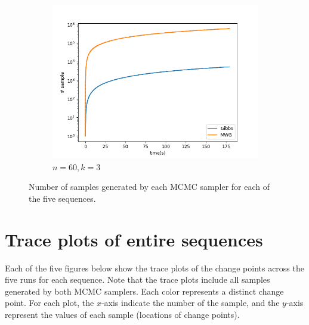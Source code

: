 \begin{figure}[H]
\begin{subfigure}{.3\textwidth}
    	\includegraphics[width=\linewidth]{../../plots/SampleTime_M4_N60_NMCMC3_seed0_diffind2.png}
    	\caption{$n=60, k=3$}
	\end{subfigure}
	\caption{Number of samples generated by each MCMC sampler for each of the five sequences.}
\end{figure}

\section{Trace plots of entire sequences}\label{appendix:trace_full}

Each of the five figures below show the trace plots of the change points across the five runs for each sequence. Note that the trace plots include all samples generated by both MCMC samplers. Each color represents a distinct change point. For each plot, the $x$-axis indicate the number of the sample, and the $y$-axis represent the values of each sample (locations of change points).

